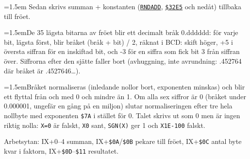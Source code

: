 \begin{Listing}
\begin{Note}
\par\noindent\hangindent=1.5em Sedan skrivs summan + konstanten (\hyperlink{l:RNDADD}{\texttt{RNDADD}}, \hyperlink{a:32E5}{\texttt{\$32E5}} och nedåt) tillbaka till fröet.\par
\par\noindent\hangindent=1.5emDe 35 lägsta bitarna av fröet blir ett decimalt bråk 0.dddddd: för varje bit, lägsta först, blir bråket (bråk + bit) / 2, räknat i BCD: skift höger, +5 i översta siffran för en inskiftad bit, och \mbox{-}3 för en siffra som fick bit 3 från siffran över. Siffrorna efter den sjätte faller bort (avhuggning, inte avrundning: .452764 där bråket är .4527646…).\par
\par\noindent\hangindent=1.5emBråket normaliseras (inledande nollor bort, exponenten minskas) och blir ett flyttal från och med 0 och mindre än 1. Om alla sex siffror är 0 (bråket under 0.000001, ungefär en gång på en miljon) slutar normaliseringen efter tre hela nollbyte med exponenten \texttt{\$7A} i stället för 0. Talet skrivs ut som 0 men är ingen riktig nolla: \texttt{X=0} är falskt, \texttt{X{}0} sant, \texttt{SGN(X)} ger 1 och \texttt{X{}1E-100} falskt.\par
\par\noindent Arbetsytan: IX+0–4 summan, IX+\texttt{\$0A}/\texttt{\$0B} pekare till fröet, IX+\texttt{\$0C} antal byte kvar i faktorn, IX+\texttt{\$0D}–\texttt{\$11} resultatet.\par\end{Note}

\end{Listing}
